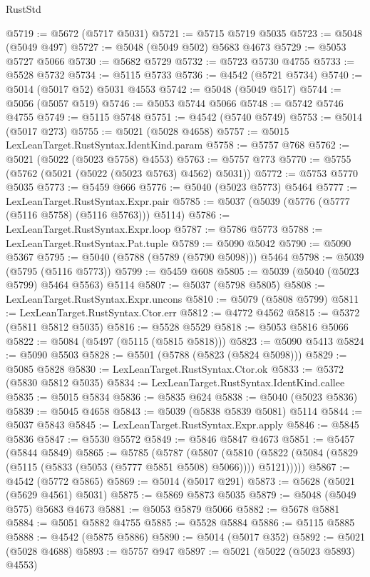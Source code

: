 \begin{lexlean}{RustStd}
\begin{coremodule}
@5719 := @5672 (@5717 @5031)
@5721 := @5715 @5719 @5035
@5723 := @5048 (@5049 @497)
@5727 := @5048 (@5049 @502) @5683 @4673
@5729 := @5053 @5727 @5066
@5730 := @5682 @5729
@5732 := @5723 @5730 @4755
@5733 := @5528 @5732
@5734 := @5115 @5733
@5736 := @4542 (@5721 @5734)
@5740 := @5014 (@5017 @52) @5031 @4553
@5742 := @5048 (@5049 @517)
@5744 := @5056 (@5057 @519)
@5746 := @5053 @5744 @5066
@5748 := @5742 @5746 @4755
@5749 := @5115 @5748
@5751 := @4542 (@5740 @5749)
@5753 := @5014 (@5017 @273)
@5755 := @5021 (@5028 @4658)
@5757 := @5015 LexLeanTarget.RustSyntax.IdentKind.param
@5758 := @5757 @768
@5762 := @5021 (@5022 (@5023 @5758) @4553)
@5763 := @5757 @773
@5770 := @5755 (@5762 (@5021 (@5022 (@5023 @5763) @4562) @5031))
@5772 := @5753 @5770 @5035
@5773 := @5459 @666
@5776 := @5040 (@5023 @5773) @5464
@5777 := LexLeanTarget.RustSyntax.Expr.pair
@5785 := @5037 (@5039 (@5776 (@5777 (@5116 @5758) (@5116 @5763))) @5114)
@5786 := LexLeanTarget.RustSyntax.Expr.loop
@5787 := @5786 @5773
@5788 := LexLeanTarget.RustSyntax.Pat.tuple
@5789 := @5090 @5042
@5790 := @5090 @5367
@5795 := @5040 (@5788 (@5789 (@5790 @5098))) @5464
@5798 := @5039 (@5795 (@5116 @5773))
@5799 := @5459 @608
@5805 := @5039 (@5040 (@5023 @5799) @5464 @5563) @5114
@5807 := @5037 (@5798 @5805)
@5808 := LexLeanTarget.RustSyntax.Expr.uncons
@5810 := @5079 (@5808 @5799)
@5811 := LexLeanTarget.RustSyntax.Ctor.err
@5812 := @4772 @4562
@5815 := @5372 (@5811 @5812 @5035)
@5816 := @5528 @5529
@5818 := @5053 @5816 @5066
@5822 := @5084 (@5497 (@5115 (@5815 @5818)))
@5823 := @5090 @5413
@5824 := @5090 @5503
@5828 := @5501 (@5788 (@5823 (@5824 @5098)))
@5829 := @5085 @5828
@5830 := LexLeanTarget.RustSyntax.Ctor.ok
@5833 := @5372 (@5830 @5812 @5035)
@5834 := LexLeanTarget.RustSyntax.IdentKind.callee
@5835 := @5015 @5834
@5836 := @5835 @624
@5838 := @5040 (@5023 @5836)
@5839 := @5045 @4658
@5843 := @5039 (@5838 @5839 @5081) @5114
@5844 := @5037 @5843
@5845 := LexLeanTarget.RustSyntax.Expr.apply
@5846 := @5845 @5836
@5847 := @5530 @5572
@5849 := @5846 @5847 @4673
@5851 := @5457 (@5844 @5849)
@5865 := @5785
    (@5787
      (@5807
        (@5810 (@5822 (@5084 (@5829 (@5115 (@5833 (@5053 (@5777 @5851 @5508) @5066)))) @5121)))))
@5867 := @4542 (@5772 @5865)
@5869 := @5014 (@5017 @291)
@5873 := @5628 (@5021 (@5629 @4561) @5031)
@5875 := @5869 @5873 @5035
@5879 := @5048 (@5049 @575) @5683 @4673
@5881 := @5053 @5879 @5066
@5882 := @5678 @5881
@5884 := @5051 @5882 @4755
@5885 := @5528 @5884
@5886 := @5115 @5885
@5888 := @4542 (@5875 @5886)
@5890 := @5014 (@5017 @352)
@5892 := @5021 (@5028 @4688)
@5893 := @5757 @947
@5897 := @5021 (@5022 (@5023 @5893) @4553)

\end{coremodule}
\end{lexlean}
